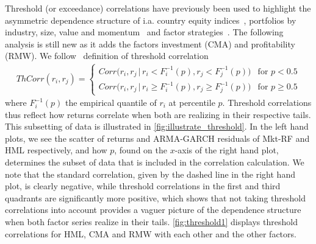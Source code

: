 Threshold (or exceedance) correlations have previously been used to highlight the asymmetric dependence structure of i.a. country equity indices~\autocite{LonginSolnik2001}, portfolios by industry, size, value and momentum~\autocite{AngChen2002} and factor strategies~\autocite{ChristoffersenLanglois2013}. The following analysis is still new as it adds the factors investment (CMA) and profitability (RMW). We follow~\textcite{ChristoffersenLanglois2013} definition of threshold correlation
\begin{align}
    ThCorr(r_i, r_j) = 
    \begin{cases} 
        Corr\Big(r_i, r_j \,|\, r_i < F_i^{-1}(p), r_j < F_j^{-1}(p)\Big)  & \text{for } p < 0.5 \\
        Corr\Big(r_i, r_j \,|\, r_i \geq F_i^{-1}(p), r_j \geq F_j^{-1}(p)\Big)  & \text{for } p \geq 0.5
    \end{cases}
\end{align}
where $F_i^{-1}(p)$ the empirical quantile of $r_i$ at percentile $p$. Threshold correlations thus reflect how returns correlate when both are realizing in their respective tails. This subsetting of data is illustrated in \autoref{fig:illustrate_threshold}. In the left hand plots, we see the scatter of returns and ARMA-GARCH residuals of Mkt-RF and HML respectively, and how $p$, found on the $x$-axis of the right hand plot, determines the subset of data that is included in the correlation calculation. We note that the standard correlation, given by the dashed line in the right hand plot, is clearly negative, while threshold correlations in the first and third quadrants are significantly more positive, which shows that not taking threshold correlations into account provides a vaguer picture of the dependence structure when both factor series realize in their tails. \autoref{fig:threshold1} displays threshold correlations for HML, CMA and RMW with each other and the other factors.

